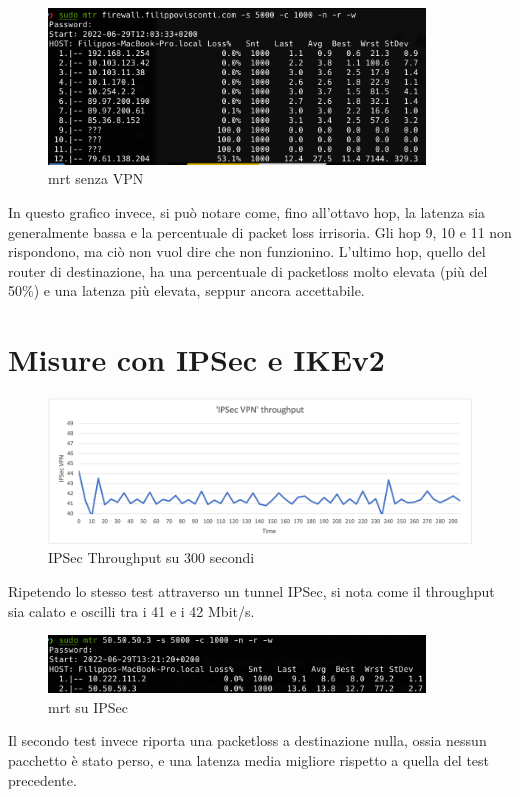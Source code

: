 \begin{figure}[ht]
    \centering
    \includegraphics[width=10cm]{figure/mrt_16min_noVPN.png}
    \caption{mrt senza VPN}
\end{figure}

In questo grafico invece, si può notare come, fino all'ottavo hop, la latenza sia generalmente bassa e la percentuale di packet loss irrisoria. Gli hop 9, 10 e 11 non rispondono, ma ciò non vuol dire che non funzionino. L'ultimo hop, quello del router di destinazione, ha una percentuale di packetloss molto elevata (più del 50\%) e una latenza più elevata, seppur ancora accettabile.

\section{Misure con IPSec e IKEv2}
\begin{figure}[ht]
    \centering
    \includegraphics[width=12cm]{figure/vpn_thr.png-2.png}
    \caption{IPSec Throughput su 300 secondi}
\end{figure}
Ripetendo lo stesso test attraverso un tunnel IPSec, si nota come il throughput sia calato e oscilli tra i 41 e i 42 Mbit/s.

\begin{figure}[ht]
    \centering
    \includegraphics[width=10cm]{figure/mtr_16min_ipsec.png}
    \caption{mrt su IPSec}
\end{figure}
Il secondo test invece riporta una packetloss a destinazione nulla, ossia nessun pacchetto è stato perso, e una latenza media migliore rispetto a quella del test precedente.


